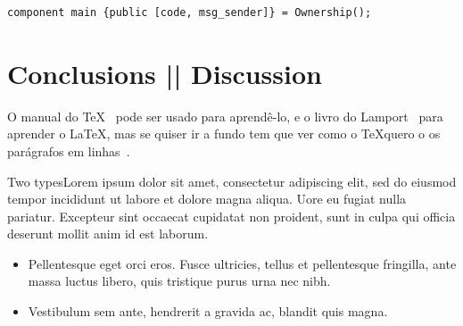 \documentclass[portrait]{poster}
\begin{document}
\begin{multicols}{2}
\begin{verbatim}
component main {public [code, msg_sender]} = Ownership();
    \end{verbatim}

\section{Conclusions || Discussion}

O manual do \TeX~\cite{knuth1986} pode ser usado para aprendê-lo, e o livro do
Lamport~\cite{lamport1994} para aprender o \LaTeX, mas se quiser ir a fundo tem
que ver como o \TeX quero o os parágrafos em linhas~\cite{knuth1981}.

Two typesLorem ipsum dolor sit amet, consectetur adipiscing elit, sed
do eiusmod tempor incididunt ut labore et dolore magna aliqua. Uore eu
fugiat nulla pariatur. Excepteur sint occaecat cupidatat non proident,
sunt in culpa qui officia deserunt mollit anim id est laborum.



\begin{itemize}
\item Pellentesque eget orci eros. Fusce ultricies, tellus et
  pellentesque fringilla, ante massa luctus libero, quis tristique
  purus urna nec nibh. 
\item Vestibulum sem ante, hendrerit a gravida ac, blandit quis magna.
\end{itemize}




\end{multicols}
\end{document}
